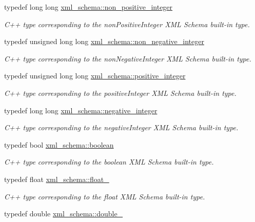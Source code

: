 \begin{DoxyCompactItemize}
typedef long long \hyperlink{namespacexml__schema_a3de6073e510eb8edd71ddc6e0256e2f9}{xml\+\_\+schema\+::non\+\_\+positive\+\_\+integer}
\begin{DoxyCompactList}\small\item\em C++ type corresponding to the non\+Positive\+Integer X\+M\+L Schema built-\/in type. \end{DoxyCompactList}\item 
typedef unsigned long long \hyperlink{namespacexml__schema_af42ef5911d65f41a0a03598b056f05aa}{xml\+\_\+schema\+::non\+\_\+negative\+\_\+integer}
\begin{DoxyCompactList}\small\item\em C++ type corresponding to the non\+Negative\+Integer X\+M\+L Schema built-\/in type. \end{DoxyCompactList}\item 
typedef unsigned long long \hyperlink{namespacexml__schema_abe9d639a15a121d2868ae2f9c974ca24}{xml\+\_\+schema\+::positive\+\_\+integer}
\begin{DoxyCompactList}\small\item\em C++ type corresponding to the positive\+Integer X\+M\+L Schema built-\/in type. \end{DoxyCompactList}\item 
typedef long long \hyperlink{namespacexml__schema_acf9528a84381d07f2802785c947bf441}{xml\+\_\+schema\+::negative\+\_\+integer}
\begin{DoxyCompactList}\small\item\em C++ type corresponding to the negative\+Integer X\+M\+L Schema built-\/in type. \end{DoxyCompactList}\item 
typedef bool \hyperlink{namespacexml__schema_ae5ada4ec9c54b51765c3e4c0e9631bba}{xml\+\_\+schema\+::boolean}
\begin{DoxyCompactList}\small\item\em C++ type corresponding to the boolean X\+M\+L Schema built-\/in type. \end{DoxyCompactList}\item 
typedef float \hyperlink{namespacexml__schema_ad7e04ab17bba0b3fdde43fb79ef6ed87}{xml\+\_\+schema\+::float\+\_\+}
\begin{DoxyCompactList}\small\item\em C++ type corresponding to the float X\+M\+L Schema built-\/in type. \end{DoxyCompactList}\item 
typedef double \hyperlink{namespacexml__schema_aac2d3d3483d3a20e8d96d2e8e5b3a470}{xml\+\_\+schema\+::double\+\_\+}

\end{DoxyCompactItemize}
